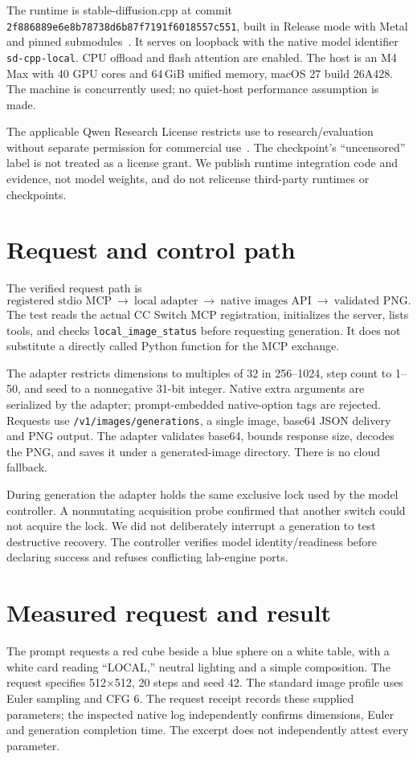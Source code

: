 \documentclass[11pt]{article}
\begin{document}
The runtime is stable-diffusion.cpp at commit \texttt{2f886889e6e8b78738d6b87f7191f6018557c551}, built in Release mode with Metal and pinned submodules~\cite{runtime}. It serves on loopback with the native model identifier \texttt{sd-cpp-local}. CPU offload and flash attention are enabled. The host is an M4 Max with 40 GPU cores and 64\,GiB unified memory, macOS 27 build 26A428. The machine is concurrently used; no quiet-host performance assumption is made.

The applicable Qwen Research License restricts use to research/evaluation without separate permission for commercial use~\cite{license}. The checkpoint's ``uncensored'' label is not treated as a license grant. We publish runtime integration code and evidence, not model weights, and do not relicense third-party runtimes or checkpoints.

\section{Request and control path}
The verified request path is
\[
\text{registered stdio MCP}\ \rightarrow\ \text{local adapter}\ \rightarrow\
\text{native images API}\ \rightarrow\ \text{validated PNG}.
\]
The test reads the actual CC Switch MCP registration, initializes the server, lists tools, and checks \texttt{local\_image\_status} before requesting generation. It does not substitute a directly called Python function for the MCP exchange.

The adapter restricts dimensions to multiples of 32 in 256--1024, step count to 1--50, and seed to a nonnegative 31-bit integer. Native extra arguments are serialized by the adapter; prompt-embedded native-option tags are rejected. Requests use \texttt{/v1/images/generations}, a single image, base64 JSON delivery and PNG output. The adapter validates base64, bounds response size, decodes the PNG, and saves it under a generated-image directory. There is no cloud fallback.

During generation the adapter holds the same exclusive lock used by the model controller. A nonmutating acquisition probe confirmed that another switch could not acquire the lock. We did not deliberately interrupt a generation to test destructive recovery. The controller verifies model identity/readiness before declaring success and refuses conflicting lab-engine ports.

\section{Measured request and result}
The prompt requests a red cube beside a blue sphere on a white table, with a white card reading ``LOCAL,'' neutral lighting and a simple composition. The request specifies 512$\times$512, 20 steps and seed 42. The standard image profile uses Euler sampling and CFG 6. The request receipt records these supplied parameters; the inspected native log independently confirms dimensions, Euler and generation completion time. The excerpt does not independently attest every parameter.
\end{document}

